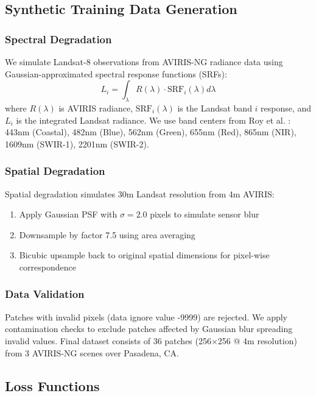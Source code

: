 \documentclass[]{spieman}
\begin{document}
\subsection{Synthetic Training Data Generation}

\subsubsection{Spectral Degradation}

We simulate Landsat-8 observations from AVIRIS-NG radiance data using Gaussian-approximated spectral response functions (SRFs):
\begin{equation}
L_i = \int_{\lambda} R(\lambda) \cdot \text{SRF}_i(\lambda) d\lambda
\end{equation}
where $R(\lambda)$ is AVIRIS radiance, $\text{SRF}_i(\lambda)$ is the Landsat band $i$ response, and $L_i$ is the integrated Landsat radiance. We use band centers from Roy et al. \cite{roy2014landsat}: 443nm (Coastal), 482nm (Blue), 562nm (Green), 655nm (Red), 865nm (NIR), 1609nm (SWIR-1), 2201nm (SWIR-2).

\subsubsection{Spatial Degradation}

Spatial degradation simulates 30m Landsat resolution from 4m AVIRIS:
\begin{enumerate}
\item Apply Gaussian PSF with $\sigma=2.0$ pixels to simulate sensor blur
\item Downsample by factor 7.5 using area averaging
\item Bicubic upsample back to original spatial dimensions for pixel-wise correspondence
\end{enumerate}

\subsubsection{Data Validation}

Patches with invalid pixels (data ignore value -9999) are rejected. We apply contamination checks to exclude patches affected by Gaussian blur spreading invalid values. Final dataset consists of 36 patches (256×256 @ 4m resolution) from 3 AVIRIS-NG scenes over Pasadena, CA.

\subsection{Loss Functions}
\end{document}
